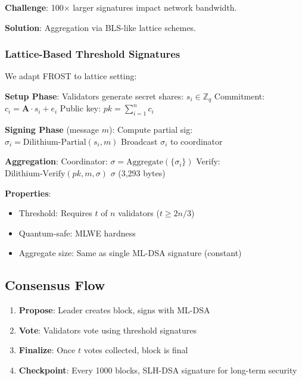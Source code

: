 \textbf{Challenge}: 100$\times$ larger signatures impact network bandwidth.

\textbf{Solution}: Aggregation via BLS-like lattice schemes.

\subsubsection{Lattice-Based Threshold Signatures}

We adapt FROST \cite{komlo2020frost} to lattice setting:

\begin{algorithm}
\caption{Quantum-Safe Threshold Signature}
\begin{algorithmic}
\STATE \textbf{Setup Phase}:
\STATE Validators generate secret shares: $s_i \in \mathbb{Z}_q$
\STATE Commitment: $c_i = \mathbf{A} \cdot s_i + e_i$
\STATE Public key: $pk = \sum_{i=1}^n c_i$

\STATE \textbf{Signing Phase} (message $m$):
    \STATE Compute partial sig: $\sigma_i = \text{Dilithium-Partial}(s_i, m)$
    \STATE Broadcast $\sigma_i$ to coordinator
\ENDFOR

\STATE \textbf{Aggregation}:
\STATE Coordinator: $\sigma = \text{Aggregate}(\{\sigma_i\})$
\STATE Verify: $\text{Dilithium-Verify}(pk, m, \sigma)$
\RETURN $\sigma$ (3,293 bytes)
\end{algorithmic}
\end{algorithm}

\textbf{Properties}:
\begin{itemize}
    \item Threshold: Requires $t$ of $n$ validators ($t \geq 2n/3$)
    \item Quantum-safe: MLWE hardness
    \item Aggregate size: Same as single ML-DSA signature (constant)
\end{itemize}

\subsection{Consensus Flow}

\begin{enumerate}
    \item \textbf{Propose}: Leader creates block, signs with ML-DSA
    \item \textbf{Vote}: Validators vote using threshold signatures
    \item \textbf{Finalize}: Once $t$ votes collected, block is final
    \item \textbf{Checkpoint}: Every 1000 blocks, SLH-DSA signature for long-term security
\end{enumerate}

